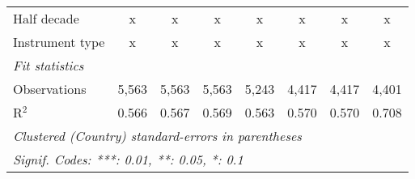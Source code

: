 \begin{tabular}{lccccccc}
   Half decade                                                                           & x             & x       & x             & x             & x             & x             & x\\  
   Instrument type                                                                       & x             & x       & x             & x             & x             & x             & x\\  
   \midrule \emph{Fit statistics}\\
   Observations                                                                          & 5,563         & 5,563   & 5,563         & 5,243         & 4,417         & 4,417         & 4,401\\  
   R$^2$                                                                                 & 0.566         & 0.567   & 0.569         & 0.563         & 0.570         & 0.570         & 0.708\\  
   \midrule
   \multicolumn{8}{l}{\emph{Clustered (Country) standard-errors in parentheses}}\\
   \multicolumn{8}{l}{\emph{Signif. Codes: ***: 0.01, **: 0.05, *: 0.1}}\\
\end{tabular}
\par\endgroup


